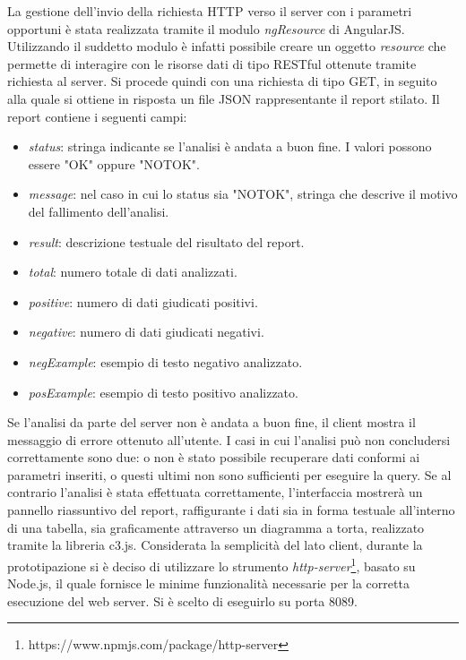 La gestione dell'invio della richiesta HTTP verso il server con i parametri opportuni è stata realizzata tramite il modulo \textit{ngResource} di AngularJS. Utilizzando il suddetto modulo è infatti possibile creare un oggetto \textit{resource} che permette di interagire con le risorse dati di tipo RESTful ottenute tramite richiesta al server. Si procede quindi con una richiesta di tipo GET, in seguito alla quale si ottiene in risposta un file JSON rappresentante il report stilato. Il report contiene i seguenti campi:
\begin{itemize}
    \item \textit{status}: stringa indicante se l'analisi è andata a buon fine. I valori possono essere "OK" oppure "NOTOK".
    \item \textit{message}: nel caso in cui lo status sia "NOTOK", stringa che descrive il motivo del fallimento dell'analisi.
    \item \textit{result}: descrizione testuale del risultato del report.
    \item \textit{total}: numero totale di dati analizzati.
    \item \textit{positive}: numero di dati giudicati positivi.
    \item \textit{negative}: numero di dati giudicati negativi. 
    \item \textit{negExample}: esempio di testo negativo analizzato.
    \item \textit{posExample}: esempio di testo positivo analizzato.
\end{itemize}

Se l'analisi da parte del server non è andata a buon fine, il client mostra il messaggio di errore ottenuto all'utente. I casi in cui l'analisi può non concludersi correttamente sono due: o non è stato possibile recuperare dati conformi ai parametri inseriti, o questi ultimi non sono sufficienti per eseguire la query. \newline 
Se al contrario l'analisi è stata effettuata correttamente, l'interfaccia mostrerà un pannello riassuntivo del report, raffigurante i dati sia in forma testuale all'interno di una tabella, sia graficamente attraverso un diagramma a torta, realizzato tramite la libreria c3.js. \newline
Considerata la semplicità del lato client, durante la prototipazione si è deciso di utilizzare lo strumento \textit{http-server}\footnote{https://www.npmjs.com/package/http-server}, basato su Node.js, il quale fornisce le minime funzionalità necessarie per la corretta esecuzione del web server. Si è scelto di eseguirlo su porta 8089.

